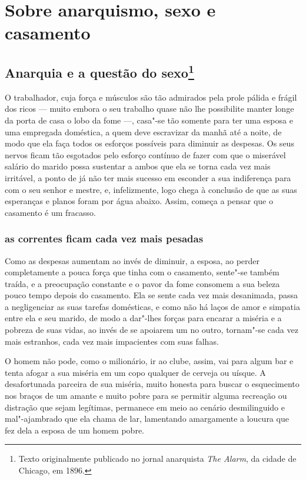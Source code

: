 \part{Sobre anarquismo, sexo e casamento}

\chapter{Anarquia e a questão do sexo\footnote{Texto originalmente publicado no
  jornal anarquista \emph{The Alarm}, da cidade de Chicago, em 1896.}}
\label{ref1}

O trabalhador, cuja força e músculos são tão admirados pela prole pálida
e frágil dos ricos --- muito embora o seu trabalho quase não lhe
possibilite manter longe da porta de casa o lobo da fome ---, casa"-se tão
somente para ter uma esposa e uma empregada doméstica, a quem deve
escravizar da manhã até a noite, de modo que ela faça todos os esforços
possíveis para diminuir as despesas. Os seus nervos ficam tão esgotados
pelo esforço contínuo de fazer com que o miserável salário do marido
possa sustentar a ambos que ela se torna cada vez mais irritável, a ponto de 
já não ter mais sucesso em esconder a sua indiferença para com o seu
senhor e mestre, e, infelizmente, logo chega à conclusão de que as suas 
esperanças e planos foram por água abaixo. Assim, começa a pensar que o
casamento é um fracasso.

\section{as correntes ficam cada vez mais pesadas}

Como as despesas aumentam ao invés de diminuir, a esposa, ao perder
completamente a pouca força que tinha com o casamento, sente"-se também
traída, e a preocupação constante e o pavor da fome consomem a sua
beleza pouco tempo depois do casamento. Ela se sente cada vez
mais desanimada, passa a negligenciar as suas tarefas domésticas, e como
não há laços de amor e simpatia entre ela e seu marido, de modo a
dar"-lhes forças para encarar a miséria e a pobreza de suas vidas, ao
invés de se apoiarem um no outro, tornam"-se cada vez mais estranhos,
cada vez mais impacientes com suas falhas.

O homem não pode, como o milionário, ir ao clube, assim, vai para algum
bar e tenta afogar a sua miséria em um copo qualquer de cerveja ou
uísque. A desafortunada parceira de sua miséria, muito honesta
para buscar o esquecimento nos braços de um amante e muito pobre para se
permitir alguma recreação ou distração que sejam legítimas, permanece em
meio ao cenário desmilinguido e mal"-ajambrado que ela chama de lar,
lamentando amargamente a loucura que fez dela a esposa de um homem
pobre.

